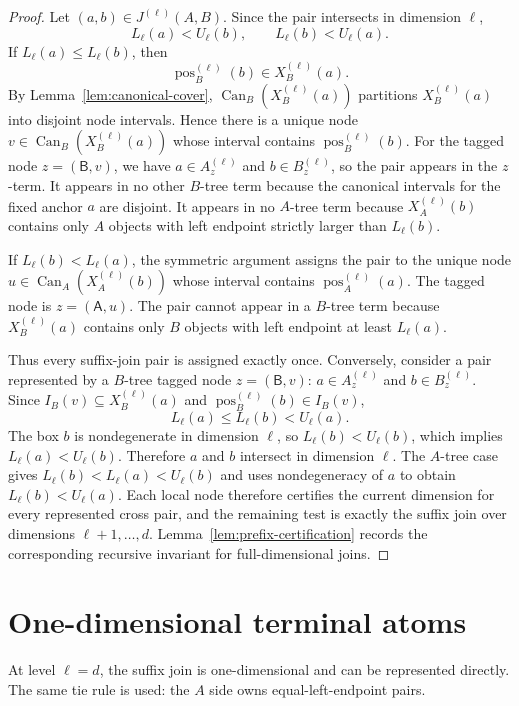\documentclass[11pt]{article}
\newcommand{\Can}{\operatorname{Can}}
\newcommand{\pos}{\operatorname{pos}}
\newcommand{\sideA}{\ensuremath{\mathsf A}}
\newcommand{\sideB}{\ensuremath{\mathsf B}}
\theoremstyle{definition}
\begin{document}
\begin{proof}
Let $(a,b)\in J^{(\ell)}(A,B)$.  Since the pair intersects in dimension $\ell$,
\[
  L_\ell(a)<U_\ell(b),
  \qquad
  L_\ell(b)<U_\ell(a).
\]
If $L_\ell(a)\le L_\ell(b)$, then
\[
  \pos_B^{(\ell)}(b)\in X_B^{(\ell)}(a).
\]
By Lemma~\ref{lem:canonical-cover}, $\Can_B(X_B^{(\ell)}(a))$ partitions $X_B^{(\ell)}(a)$ into disjoint node intervals.  Hence there is a unique node $v\in\Can_B(X_B^{(\ell)}(a))$ whose interval contains $\pos_B^{(\ell)}(b)$.  For the tagged node $z=(\sideB,v)$, we have $a\in A_z^{(\ell)}$ and $b\in B_z^{(\ell)}$, so the pair appears in the $z$-term.  It appears in no other $B$-tree term because the canonical intervals for the fixed anchor $a$ are disjoint.  It appears in no $A$-tree term because $X_A^{(\ell)}(b)$ contains only $A$ objects with left endpoint strictly larger than $L_\ell(b)$.

If $L_\ell(b)<L_\ell(a)$, the symmetric argument assigns the pair to the unique node $u\in\Can_A(X_A^{(\ell)}(b))$ whose interval contains $\pos_A^{(\ell)}(a)$.  The tagged node is $z=(\sideA,u)$.  The pair cannot appear in a $B$-tree term because $X_B^{(\ell)}(a)$ contains only $B$ objects with left endpoint at least $L_\ell(a)$.

Thus every suffix-join pair is assigned exactly once.  Conversely, consider a pair represented by a $B$-tree tagged node $z=(\sideB,v)$: $a\in A_z^{(\ell)}$ and $b\in B_z^{(\ell)}$.  Since $I_B(v)\subseteq X_B^{(\ell)}(a)$ and $\pos_B^{(\ell)}(b)\in I_B(v)$,
\[
  L_\ell(a)\le L_\ell(b)<U_\ell(a).
\]
The box $b$ is nondegenerate in dimension $\ell$, so $L_\ell(b)<U_\ell(b)$, which implies $L_\ell(a)<U_\ell(b)$.  Therefore $a$ and $b$ intersect in dimension $\ell$.  The $A$-tree case gives $L_\ell(b)<L_\ell(a)<U_\ell(b)$ and uses nondegeneracy of $a$ to obtain $L_\ell(b)<U_\ell(a)$.  Each local node therefore certifies the current dimension for every represented cross pair, and the remaining test is exactly the suffix join over dimensions $\ell+1,\ldots,d$.  Lemma~\ref{lem:prefix-certification} records the corresponding recursive invariant for full-dimensional joins.
\end{proof}

\section{One-dimensional terminal atoms}
\label{sec:base}

At level $\ell=d$, the suffix join is one-dimensional and can be represented directly.  The same tie rule is used: the $A$ side owns equal-left-endpoint pairs.
\end{document}
